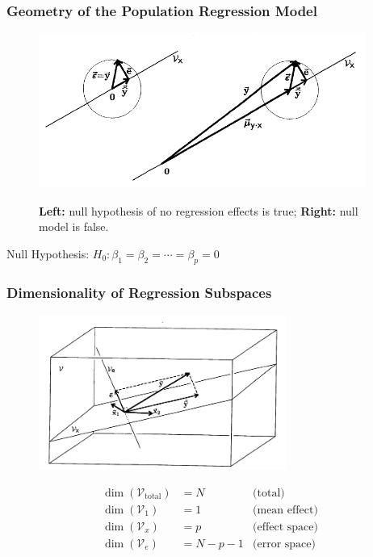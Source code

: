 \documentclass{beamer}
\begin{document}
\begin{frame}
  \frametitle{Geometry of the Population Regression Model}


\begin{figure}
{\centering \includegraphics[height=2in]{regr-error-model2.pdf}}
\caption{\textbf{Left:} null hypothesis of no regression effects is true; \textbf{Right:} null model is false.}
\end{figure}

\begin{center}
\alert{Null Hypothesis: }  $H_0: \beta_1 = \beta_2 = \cdots = \beta_p = 0$
\end{center}

\end{frame}


\begin{frame}
  \frametitle{Dimensionality of Regression Subspaces}


\begin{figure}
{\centering \includegraphics[height=2in]{regr-dimofspaces.pdf}}
\end{figure}
%
\begin{align*}
  \dim(\mathcal{V}_\text{total}) & = N &\text{(total)}\\
  \dim(\mathcal{V}_1) & = 1 &\text{(mean effect)} \\
  \dim(\mathcal{V}_x) & = p &\text{(effect space)}\\
  \dim(\mathcal{V}_e) & = N - p - 1 &\text{(error space)}
\end{align*}

\end{frame}
\end{document}
